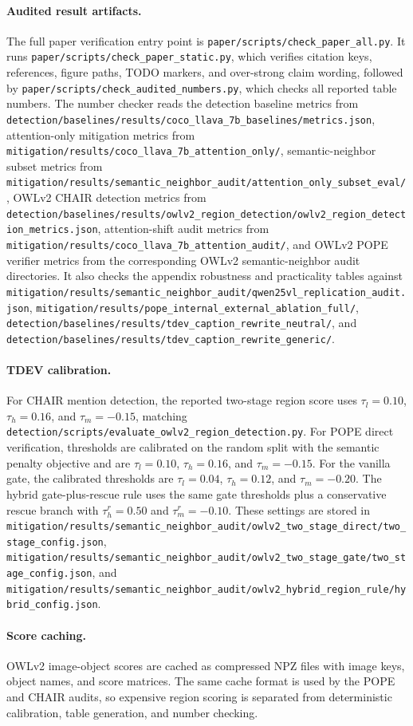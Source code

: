 \paragraph{Audited result artifacts.}
The full paper verification entry point is \texttt{paper/scripts/check\_paper\_all.py}. It runs \texttt{paper/scripts/check\_paper\_static.py}, which verifies citation keys, references, figure paths, TODO markers, and over-strong claim wording, followed by \texttt{paper/scripts/check\_audited\_numbers.py}, which checks all reported table numbers. The number checker reads the detection baseline metrics from \texttt{detection/baselines/results/coco\_llava\_7b\_baselines/metrics.json}, attention-only mitigation metrics from \texttt{mitigation/results/coco\_llava\_7b\_attention\_only/}, semantic-neighbor subset metrics from \texttt{mitigation/results/semantic\_neighbor\_audit/attention\_only\_subset\_eval/}, OWLv2 CHAIR detection metrics from \texttt{detection/baselines/results/owlv2\_region\_detection/owlv2\_region\_detection\_metrics.json}, attention-shift audit metrics from \texttt{mitigation/results/coco\_llava\_7b\_attention\_audit/}, and OWLv2 POPE verifier metrics from the corresponding OWLv2 semantic-neighbor audit directories. It also checks the appendix robustness and practicality tables against \texttt{mitigation/results/semantic\_neighbor\_audit/qwen25vl\_replication\_audit.json}, \texttt{mitigation/results/pope\_internal\_external\_ablation\_full/}, \texttt{detection/baselines/results/tdev\_caption\_rewrite\_neutral/}, and \texttt{detection/baselines/results/tdev\_caption\_rewrite\_generic/}.

\paragraph{TDEV calibration.}
For CHAIR mention detection, the reported two-stage region score uses $\tau_l=0.10$, $\tau_h=0.16$, and $\tau_m=-0.15$, matching \texttt{detection/scripts/evaluate\_owlv2\_region\_detection.py}. For POPE direct verification, thresholds are calibrated on the random split with the semantic penalty objective and are $\tau_l=0.10$, $\tau_h=0.16$, and $\tau_m=-0.15$. For the vanilla gate, the calibrated thresholds are $\tau_l=0.04$, $\tau_h=0.12$, and $\tau_m=-0.20$. The hybrid gate-plus-rescue rule uses the same gate thresholds plus a conservative rescue branch with $\tau_h^{r}=0.50$ and $\tau_m^{r}=-0.10$. These settings are stored in \texttt{mitigation/results/semantic\_neighbor\_audit/owlv2\_two\_stage\_direct/two\_stage\_config.json}, \texttt{mitigation/results/semantic\_neighbor\_audit/owlv2\_two\_stage\_gate/two\_stage\_config.json}, and \texttt{mitigation/results/semantic\_neighbor\_audit/owlv2\_hybrid\_region\_rule/hybrid\_config.json}.

\paragraph{Score caching.}
OWLv2 image-object scores are cached as compressed NPZ files with image keys, object names, and score matrices. The same cache format is used by the POPE and CHAIR audits, so expensive region scoring is separated from deterministic calibration, table generation, and number checking.
